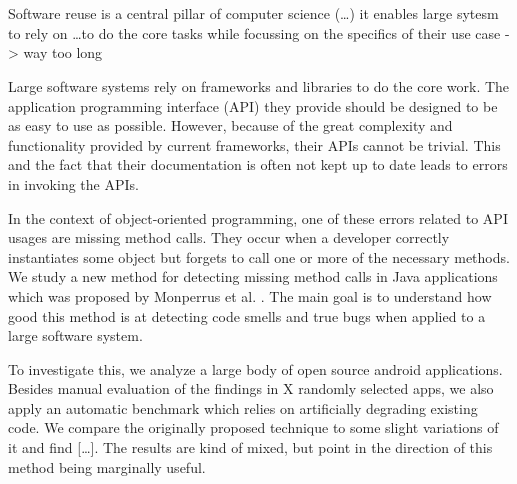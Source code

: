 \chapter{\abstractname}

Software reuse is a central pillar of computer science (\ldots)
it enables large sytesm to rely on \ldots to do the core tasks while focussing on the specifics of their use case
-> way too long

Large software systems rely on frameworks and libraries to do the core work.
The application programming interface (API) they provide should be designed to be as easy to use as possible.
However, because of the great complexity and functionality provided by current frameworks, their APIs cannot be trivial.
This and the fact that their documentation is often not kept up to date leads to errors in invoking the APIs.

In the context of object-oriented programming, one of these errors related to API usages are missing method calls.
They occur when a developer correctly instantiates some object but forgets to call one or more of the necessary methods.
We study a new method for detecting missing method calls in Java applications which was proposed by Monperrus et al. \cite{monperrus2010detecting}.
The main goal is to understand how good this method is at detecting code smells and true bugs when applied to a large software system.

To investigate this, we analyze a large body of open source android applications.
Besides manual evaluation of the findings in X randomly selected apps, we also apply an automatic benchmark which relies on artificially degrading existing code.
We compare the originally proposed technique to some slight variations of it and find [\ldots].
The results are kind of mixed, but point in the direction of this method being marginally useful.
